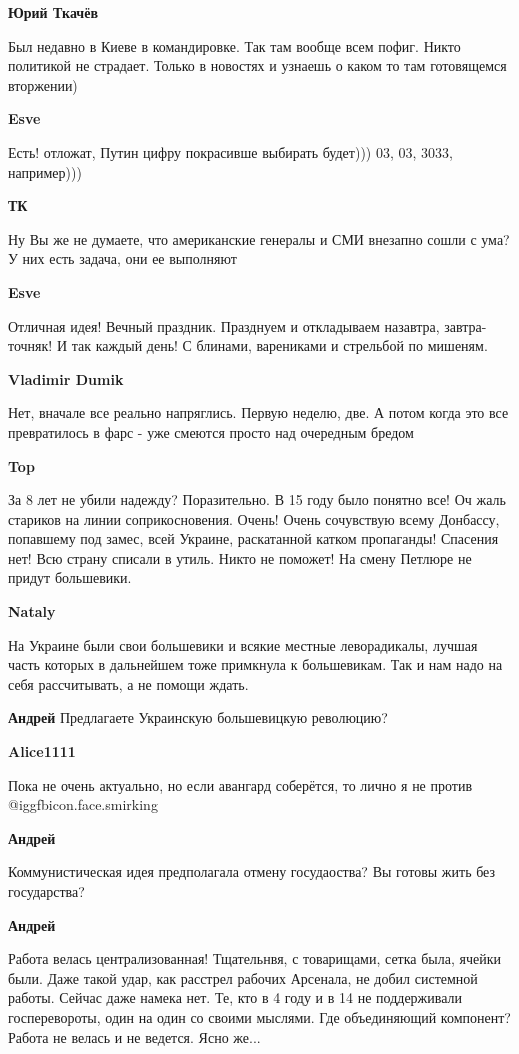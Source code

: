 \begin{itemize}
\textbf{Юрий Ткачёв}

Был недавно в Киеве в командировке. Так там вообще всем пофиг. Никто политикой
не страдает. Только в новостях и узнаешь о каком то там готовящемся вторжении)

\textbf{Esve}

Есть! отложат, Путин цифру покрасивше выбирать будет))) 03, 03, 3033,
например)))

\textbf{ТК}

Ну Вы же не думаете, что американские генералы и СМИ внезапно сошли с ума? У
них есть задача, они ее выполняют

\textbf{Esve}

Отличная идея! Вечный праздник. Празднуем и  откладываем назавтра,
завтра-точняк! И так каждый день! С блинами, варениками и стрельбой по мишеням.

\textbf{Vladimir Dumik}

Нет, вначале все реально напряглись. Первую неделю, две. А потом когда это все
превратилось в фарс - уже смеются просто над очередным бредом

\textbf{Top}

За 8 лет не убили надежду? Поразительно. В 15 году было понятно все! Оч жаль
стариков на линии соприкосновения. Очень! Очень сочувствую всему Донбассу,
попавшему под замес, всей Украине, раскатанной катком пропаганды! Спасения нет!
Всю страну списали в утиль. Никто не поможет! На смену Петлюре не придут
большевики.

\textbf{Nataly}

На Украине были свои большевики и всякие местные леворадикалы, лучшая часть
которых в дальнейшем тоже примкнула к большевикам. Так и нам надо на себя
рассчитывать, а не помощи ждать.

\textbf{Андрей}
Предлагаете Украинскую большевицкую революцию?

\textbf{Alice1111}

Пока не очень актуально, но если авангард соберётся, то лично я не против
@igg{fbicon.face.smirking} 

\textbf{Андрей}

Коммунистическая идея предполагала отмену госудаоства?
Вы готовы жить без государства?

\textbf{Андрей}

Работа велась централизованная! Тщательнвя, с товарищами, сетка была, ячейки
были. Даже такой удар, как расстрел рабочих Арсенала, не добил системной
работы. Сейчас даже намека нет. Те, кто в 4 году и в 14 не поддерживали
госперевороты, один на один со своими мыслями. Где объединяющий компонент?
Работа не велась и не ведется.  Ясно же...

\end{itemize} %
